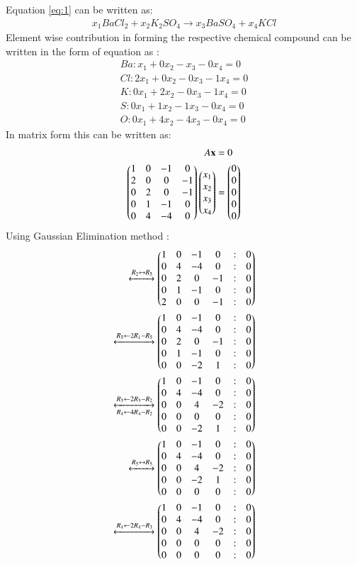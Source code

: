 \documentclass[journal,12pt,twocolumn]{IEEEtran}
\begin{document}
Equation \eqref{eq:1} can be written as:
\begin{align}
x_1BaCl_2 + x_2K_2SO_4 \rightarrow x_3BaSO_4 + x_4KCl\label{eq:2}
\end{align}
Element wise contribution in forming the respective chemical compound can be written in the form of equation as :
\begin{align}
Ba : x_1 + 0x_2 - x_3 - 0x_4 = 0\\
Cl : 2x_1 + 0x_2 - 0x_3 - 1x_4 = 0\\
K  : 0x_1 + 2x_2 - 0x_3 - 1x_4 = 0\\
S  : 0x_1 + 1x_2 - 1x_3 - 0x_4 = 0\\
O  : 0x_1 + 4x_2 - 4x_3 - 0x_4 = 0
\end{align}
In matrix form this can be written as:
\begin{align}
A\mathbf{x}&=0\\
  \begin{pmatrix}1&0&-1&0\\2&0&0&-1\\0&2&0&-1\\0&1&-1&0\\0&4&-4&0\end{pmatrix}\begin{pmatrix}x_1\\x_2\\x_3\\x_4\end{pmatrix}&=\begin{pmatrix}0\\0\\0\\0\\0\end{pmatrix}
\end{align}
Using Gaussian Elimination method :
\begin{align}
\xleftrightarrow{R_2 \leftrightarrow R_5}\begin{pmatrix}1&0&-1&0&:&0\\0&4&-4&0&:&0\\0&2&0&-1&:&0\\0&1&-1&0&:&0\\2&0&0&-1&:&0\end{pmatrix}\\
\xleftrightarrow{R_5 \leftarrow 2R_1-R_5}\begin{pmatrix}1&0&-1&0&:&0\\0&4&-4&0&:&0\\0&2&0&-1&:&0\\0&1&-1&0&:&0\\0&0&-2&1&:&0\end{pmatrix}\\
\xleftrightarrow[R_4 \leftarrow 4R_4-R_2]{R_3 \leftarrow 2R_3-R_2}\begin{pmatrix}1&0&-1&0&:&0\\0&4&-4&0&:&0\\0&0&4&-2&:&0\\0&0&0&0&:&0\\0&0&-2&1&:&0\end{pmatrix}\\
\xleftrightarrow{R_5 \leftrightarrow R_5}\begin{pmatrix}1&0&-1&0&:&0\\0&4&-4&0&:&0\\0&0&4&-2&:&0\\0&0&-2&1&:&0\\0&0&0&0&:&0\end{pmatrix}\\
\xleftrightarrow{R_4 \leftarrow 2R_4-R_3}\begin{pmatrix}1&0&-1&0&:&0\\0&4&-4&0&:&0\\0&0&4&-2&:&0\\0&0&0&0&:&0\\0&0&0&0&:&0\end{pmatrix}
\end{align}
\end{document}
